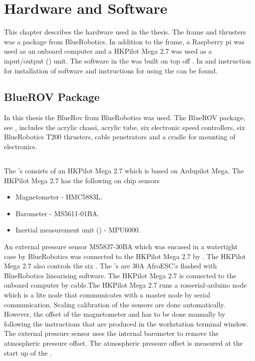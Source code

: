 \chapter{Hardware and Software}\label{cha:hardware}
This chapter describes the hardware used in the thesis. The \abbrROV frame and thrusters was a package from BlueRobotics. In addition to the \abbrROV frame, a Raspberry pi was used as an onboard computer and a HKPilot Mega 2.7  was used as a input/output (\abbrIO) unit. The software in the \abbrROV was built on top off \abbrROS. In  and  instruction for installation of software and instructions for using the \abbrROV can be found.

\section{BlueROV Package}
In this thesis the BlueRov from BlueRobotics was used. The BlueROV package, see , includes the acrylic chassi, acrylic tube, six electronic speed controllers, six BlueRobotics T200 thrusters, cable penetrators and a cradle for mounting of electronics.

\section{\abbrROV \abbrIO}
The \abbrROV's \abbrIO consists of an HKPilot Mega 2.7 which is based on Ardupilot Mega. The HKPilot Mega 2.7 has the following on chip sensors
\begin{itemize}
    \item Magnetometer - HMC5883L.
    \item Barometer - MS5611-01BA.
    \item Inertial measurement unit (\abbrIMU) - MPU6000.
\end{itemize}
An external pressure sensor MS5837-30BA which was encased in a watertight case by BlueRobotics was connected to the HKPilot Mega 2.7 by \abbrIC.
The HKPilot Mega 2.7 also controls the six \abbrESC. The \abbrESC's are 30A AfroESC's flashed with BlueRobotics linearising software. The HKPilot Mega 2.7 is connected to the onboard computer by \abbrUSB cable.The HKPilot Mega 2.7 runs a rosserial-arduino node which is a lite \abbrROS node that communicates with a master node by serial communication. Scaling calibration of the sensors are done automatically. However, the offset of the magnetometer and \abbrROV has to be done manually by following the instructions that are produced in the workstation terminal window. The external pressure sensor uses the internal barometer to remove the atmospheric pressure offset. The atmospheric pressure offset is measured at the start up of the \abbrROV.

